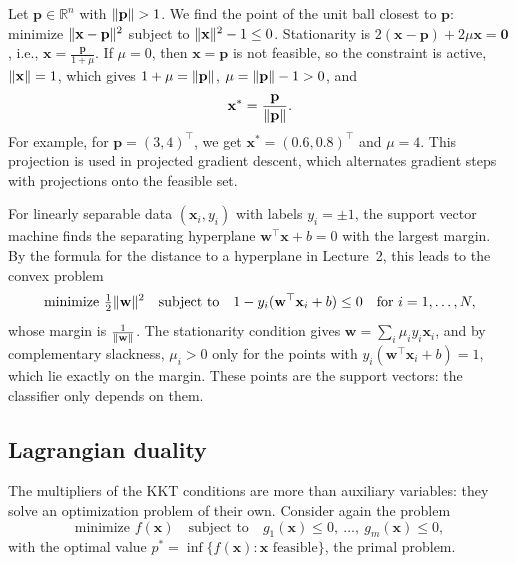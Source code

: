 \begin{example}\label{L3-ex:kkt-ball}
    Let $\mathbf{p} \in \mathbb{R}^n$ with $\lVert \mathbf{p} \rVert > 1$. We find the point of the unit ball closest to $\mathbf{p}$: minimize $\lVert \mathbf{x} - \mathbf{p} \rVert^2$ subject to $\lVert \mathbf{x} \rVert^2 - 1 \leq 0$. Stationarity is $2(\mathbf{x} - \mathbf{p}) + 2\mu\mathbf{x} = \mathbf{0}$, i.e., $\mathbf{x} = \frac{\mathbf{p}}{1 + \mu}$. If $\mu = 0$, then $\mathbf{x} = \mathbf{p}$ is not feasible, so the constraint is active, $\lVert \mathbf{x} \rVert = 1$, which gives $1 + \mu = \lVert \mathbf{p} \rVert$, $\mu = \lVert \mathbf{p} \rVert - 1 > 0$, and
    \[\mathbf{x}^* = \frac{\mathbf{p}}{\lVert \mathbf{p} \rVert}.\]
    For example, for $\mathbf{p} = (3, 4)^\top$, we get $\mathbf{x}^* = (0.6, 0.8)^\top$ and $\mu = 4$. This projection is used in projected gradient descent, which alternates gradient steps with projections onto the feasible set.
\end{example}

\begin{remark}
    For linearly separable data $(\mathbf{x}_i, y_i)$ with labels $y_i = \pm 1$, the support vector machine finds the separating hyperplane $\mathbf{w}^\top\mathbf{x} + b = 0$ with the largest margin. By the formula for the distance to a hyperplane in Lecture~2, this leads to the convex problem
    \[\text{minimize } \tfrac{1}{2}\lVert \mathbf{w} \rVert^2 \quad \text{subject to} \quad 1 - y_i(\mathbf{w}^\top\mathbf{x}_i + b) \leq 0 \quad \text{for } i = 1, \ldots, N,\]
    whose margin is $\frac{1}{\lVert \mathbf{w} \rVert}$. The stationarity condition gives $\mathbf{w} = \sum_i \mu_i y_i\mathbf{x}_i$, and by complementary slackness, $\mu_i > 0$ only for the points with $y_i(\mathbf{w}^\top\mathbf{x}_i + b) = 1$, which lie exactly on the margin. These points are the support vectors: the classifier only depends on them.
\end{remark}

\subsection{Lagrangian duality}\label{L3-sec:duality}

The multipliers of the KKT conditions are more than auxiliary variables: they solve an optimization problem of their own. Consider again the problem
\[\text{minimize } f(\mathbf{x}) \quad \text{subject to} \quad g_1(\mathbf{x}) \leq 0, \ \ldots, \ g_m(\mathbf{x}) \leq 0,\]
with the optimal value $p^* = \inf\{f(\mathbf{x}) : \mathbf{x} \text{ feasible}\}$, the primal problem.


